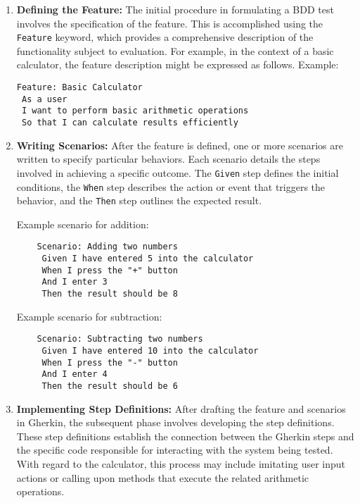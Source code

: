 \begin{enumerate}

\item \textbf{Defining the Feature:} The initial procedure in formulating a BDD test involves the specification of the feature. This is accomplished using the \texttt{Feature} keyword, which provides a comprehensive description of the functionality subject to evaluation. For example, in the context of a basic calculator, the feature description might be expressed as follows.
Example: \begin{verbatim}
Feature: Basic Calculator
 As a user
 I want to perform basic arithmetic operations
 So that I can calculate results efficiently
\end{verbatim}

\item \textbf{Writing Scenarios:} After the feature is defined, one or more scenarios are written to specify particular behaviors. Each scenario details the steps involved in achieving a specific outcome. The \texttt{Given} step defines the initial conditions, the \texttt{When} step describes the action or event that triggers the behavior, and the \texttt{Then} step outlines the expected result.

Example scenario for addition:
\begin{verbatim}
    Scenario: Adding two numbers
     Given I have entered 5 into the calculator
     When I press the "+" button
     And I enter 3
     Then the result should be 8
\end{verbatim}

Example scenario for subtraction:
\begin{verbatim}
    Scenario: Subtracting two numbers
     Given I have entered 10 into the calculator
     When I press the "-" button
     And I enter 4
     Then the result should be 6
\end{verbatim}

\item \textbf{Implementing Step Definitions:} After drafting the feature and scenarios in Gherkin, the subsequent phase involves developing the step definitions. These step definitions establish the connection between the Gherkin steps and the specific code responsible for interacting with the system being tested. With regard to the calculator, this process may include imitating user input actions or calling upon methods that execute the related arithmetic operations.
\end{enumerate}

